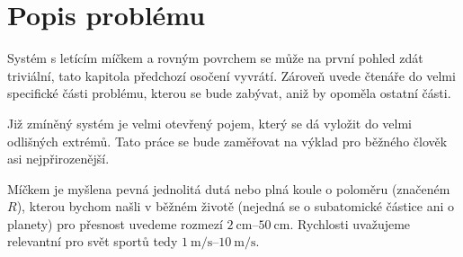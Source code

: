 \chapter{Popis problému}
\label{sec:popis-problemu}

Systém s letícím míčkem a rovným povrchem se může na první pohled zdát
triviální, tato kapitola předchozí osočení vyvrátí. Zároveň uvede čtenáře do
velmi specifické části problému, kterou se bude zabývat, aniž by opoměla ostatní
části.

Již zmíněný systém je velmi otevřený pojem, který se dá
vyložit do velmi odlišných extrémů. Tato práce se bude zaměřovat na výklad pro
běžného člověk asi nejpřirozenější.

Míčkem je myšlena pevná jednolitá dutá nebo plná koule o poloměru (značeném
$R$), kterou bychom našli v běžném životě (nejedná se o subatomické částice ani
o planety) pro přesnost uvedeme rozmezí $\qtyrange{2}{50}{\centi\metre}$. Rychlosti
uvažujeme relevantní pro svět sportů tedy $\qtyrange{1}{10}{\meter\per\second}$.




